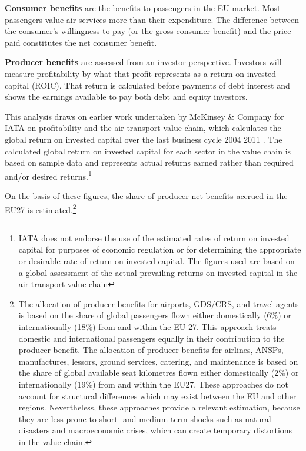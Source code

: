 \documentclass[
  11pt,
  a4paper,
]{book}
\begin{document}
\textbf{Consumer benefits} are the benefits to passengers in the EU
market. Most passengers value air services more than their expenditure.
The difference between the consumer's willingness to pay (or the gross
consumer benefit) and the price paid constitutes the net consumer
benefit.

\textbf{Producer benefits} are assessed from an investor perspective.
Investors will measure profitability by what that profit represents as a
return on invested capital (ROIC). That return is calculated before
payments of debt interest and shows the earnings available to pay both
debt and equity investors.

This analysis draws on earlier work undertaken by McKinsey \& Company
for IATA on profitability and the air transport value chain, which
calculates the global return on invested capital over the last business
cycle 2004 2011 . The calculated global return on invested capital for
each sector in the value chain is based on sample data and represents
actual returns earned rather than required and/or desired
returns.\footnote{IATA does not endorse the use of the estimated rates
  of return on invested capital for purposes of economic regulation or
  for determining the appropriate or desirable rate of return on
  invested capital. The figures used are based on a global assessment of
  the actual prevailing returns on invested capital in the air transport
  value chain}

On the basis of these figures, the share of producer net benefits
accrued in the EU27 is estimated.\footnote{The allocation of producer
  benefits for airports, GDS/CRS, and travel agents is based on the
  share of global passengers flown either domestically (6\%) or
  internationally (18\%) from and within the EU-27. This approach treats
  domestic and international passengers equally in their contribution to
  the producer benefit. The allocation of producer benefits for
  airlines, ANSPs, manufactures, lessors, ground services, catering, and
  maintenance is based on the share of global available seat kilometres
  flown either domestically (2\%) or internationally (19\%) from and
  within the EU27. These approaches do not account for structural
  differences which may exist between the EU and other regions.
  Nevertheless, these approaches provide a relevant estimation, because
  they are less prone to short- and medium-term shocks such as natural
  disasters and macroeconomic crises, which can create temporary
  distortions in the value chain.}
\end{document}
